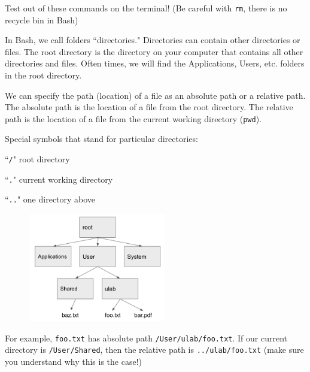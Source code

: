 \documentclass[addpoints,12pt]{exam}
\numberwithin{equation}{section}
\begin{document}
\begin{questions}
		
		Test out of these commands on the terminal! (Be careful with \verb|rm|, there is no recycle bin in Bash)
		
		\newpage
		
		\question[10] In Bash, we call folders ``directories." Directories can contain other directories or files. The root directory is the directory on your computer that contains all other directories and files. Often times, we will find the Applications, Users, etc. folders in the root directory.
		
		We can specify the path (location) of a file as an absolute path or a relative path. The absolute path is the location of a file from the root directory. The relative path is the location of a file from the current working directory (\verb|pwd|).
		
		Special symbols that stand for particular directories:
		
		``\verb|/|" root directory
		
		``\verb|.|" current working directory
		
		``\verb|..|" one directory above
		
		\begin{figure}[H]
			\centering
			\includegraphics[width=6cm] {dir.png}
		\end{figure}
		
		For example, \verb|foo.txt| has absolute path \verb|/User/ulab/foo.txt|. If our current directory is \verb|/User/Shared|, then the relative path is \verb|../ulab/foo.txt| (make sure you understand why this is the case!)
		

\end{questions}
\end{document}
